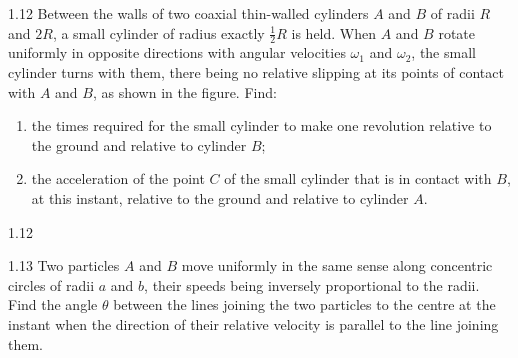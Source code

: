 \begin{problem}{1.12}
Between the walls of two coaxial thin-walled cylinders $A$ and $B$ of radii $R$ and $2R$, a small cylinder of radius exactly $\frac12 R$ is held. When $A$ and $B$ rotate uniformly in opposite directions with angular velocities $\omega_1$ and $\omega_2$, the small cylinder turns with them, there being no relative slipping at its points of contact with $A$ and $B$, as shown in the figure. Find:
\begin{enumerate}[label=(\arabic*),leftmargin=2.2em,itemsep=1pt,topsep=2pt]
\item the times required for the small cylinder to make one revolution relative to the ground and relative to cylinder $B$;
\item the acceleration of the point $C$ of the small cylinder that is in contact with $B$, at this instant, relative to the ground and relative to cylinder $A$.
\end{enumerate}
\end{problem}

\begin{figbox}{1.12}
\end{figbox}

\begin{problem}{1.13}
Two particles $A$ and $B$ move uniformly in the same sense along concentric circles of radii $a$ and $b$, their speeds being inversely proportional to the radii. Find the angle $\theta$ between the lines joining the two particles to the centre at the instant when the direction of their relative velocity is parallel to the line joining them.
\end{problem}

